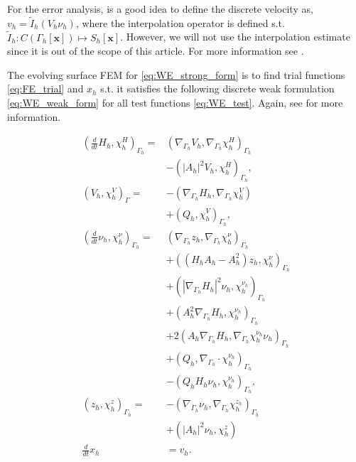 For the error analysis, is a good idea to define the discrete velocity as, $v_{h} = \widetilde{I}_{h}\left( V_{h} \nu _{h} \right)  $,  where the interpolation operator is defined s.t. $ \widetilde{I}_{h}: C\left( \Gamma _{h}\left[ \mathbf{x} \right] \right) \mapsto  S_{h}\left[
\mathbf{x} \right]     $. However, we will not use the interpolation estimate since it is out of the scope of this article. For more information see \cite[Remark 3.1]{kovacs2021convergent}.


The evolving surface FEM for \eqref{eq:WE_strong_form} is to find trial functions \eqref{eq:FE_trial} and $x_{h} $ s.t. it satisfies the following discrete weak formulation \eqref{eq:WE_weak_form} for
all test functions \eqref{eq:WE_test}. Again, see \cite{kovacs2021convergent} for more information.

\begin{subequations}
\label{eq:FEM}
 \begin{align}
\left( \frac{d}{dt}H_{h}, \chi_{h} ^{H} \right)_{\Gamma_{h} } =&  \left( \nabla _{\Gamma_{h} } V_{h}, \nabla _{\Gamma_{h} }\chi_{h} ^{H} \right) _{\Gamma_{h} } \nonumber \\
                                                   &- \left( \left\lvert A_{h} \right\rvert ^2 V_{h}, \chi_{h} ^{H} \right) _{\Gamma_{h} },   \\
\left( V_{h}, \chi_{h} ^{V} \right)_{\Gamma } =& -\left( \nabla _{\Gamma_{h} } H_{h}, \nabla _{\Gamma_{h} } \chi_{h} ^{V} \right) \nonumber \\
 & + \left( Q_{h}, \chi_{h} ^{V} \right)_{\Gamma_{h} },   \\
\left( \frac{d}{dt} \nu_{h} , \chi_{h} ^{\nu } \right)_{\Gamma_{h} } =& \left( \nabla _{\Gamma_{h} }z_{h}, \nabla _{\Gamma_{h} } \chi_{h} ^{\nu } \right) _{\Gamma_{h} }\nonumber   \\
 & + \left( ( H_{h}A_{h} - A_{h}^2  )z_{h},\chi_{h}^\nu  \right)_{\Gamma_{h} }   \nonumber \\
 & + \left( \left\lvert \nabla _{\Gamma_{h} } H_{h} \right\rvert^2 \nu_{h} , \chi_{h} ^{\nu_{h} }  \right)_{\Gamma_{h}} \nonumber  \\
 & + \left(  A_{h}^2\nabla _{\Gamma_{h} } H_{h}, \chi_{h} ^{\nu_{h} }  \right)_{\Gamma_{h}} \nonumber  \\
 & + 2 \left( A_{h} \nabla _{\Gamma_{h} } H_{h}, \nabla _{\Gamma_{h} } \chi_{h} ^{\nu_{h} } \nu_{h}  \right)_{\Gamma_{h}} \nonumber    \\
 &  + \left( Q_{h}, \nabla _{\Gamma_{h} } \cdot \chi_{h} ^{\nu_{h} }  \right)_{\Gamma_{h} } \nonumber  \\
  &- \left( Q_{h}H_{h}\nu_{h} , \chi_{h} ^{\nu_{h} } \right) _{\Gamma_{h}},\\
\left( z_{h}, \chi_{h} ^{z} \right) _{\Gamma_{h} }  =& - \left( \nabla _{\Gamma_{h} } \nu_{h} , \nabla _{\Gamma_{h} } \chi_{h} ^{z_{h}} \right)_{\Gamma_{h}} \nonumber \\
 & + \left( \left\lvert A_{h} \right\rvert ^2 \nu_{h} , \chi_{h} ^{z} \right) \\
\frac{d}{dt}x_h &= v_h
 .\end{align}
\end{subequations}
